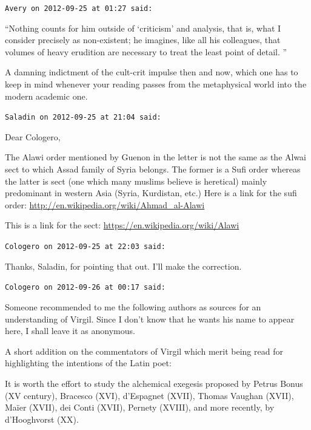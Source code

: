 \begin{footnotesize}
\begin{sffamily}
\texttt{Avery on 2012-09-25 at 01:27 said:}

``Nothing counts for him outside of `criticism' and analysis, that is, what I consider precisely as non-existent; he imagines, like all his colleagues, that volumes of heavy erudition are necessary to treat the least point of detail. ''

A damning indictment of the cult-crit impulse then and now, which one has to keep in mind whenever your reading passes from the metaphysical world into the modern academic one.

\hfill

\texttt{Saladin on 2012-09-25 at 21:04 said:}

Dear Cologero,

The Alawi order mentioned by Guenon in the letter is not the same as the Alwai sect to which Assad family of Syria belongs. The former is a Sufi order whereas the latter is sect (one which many muslims believe is heretical) mainly predominant in western Asia (Syria, Kurdistan, etc.) Here is a link for the sufi order: \url{http://en.wikipedia.org/wiki/Ahmad\_al-Alawi}

This is a link for the sect:
\url{https://en.wikipedia.org/wiki/Alawi}


\hfill

\texttt{Cologero on 2012-09-25 at 22:03 said:}

Thanks, Saladin, for pointing that out. I'll make the correction.

\hfill

\texttt{Cologero on 2012-09-26 at 00:17 said:}

Someone recommended to me the following authors as sources for an understanding of Virgil. Since I don't know that he wants his name to appear here, I shall leave it as anonymous.

A short addition on the commentators of Virgil which merit being read for highlighting the intentions of the Latin poet:

It is worth the effort to study the alchemical exegesis proposed by Petrus Bonus (XV century), Bracesco (XVI), d'Espagnet (XVII), Thomas Vaughan (XVII), Maïer (XVII), dei Conti (XVII), Pernety (XVIII), and more recently, by d'Hooghvorst (XX).


\hfill

\end{sffamily}
\end{footnotesize}

